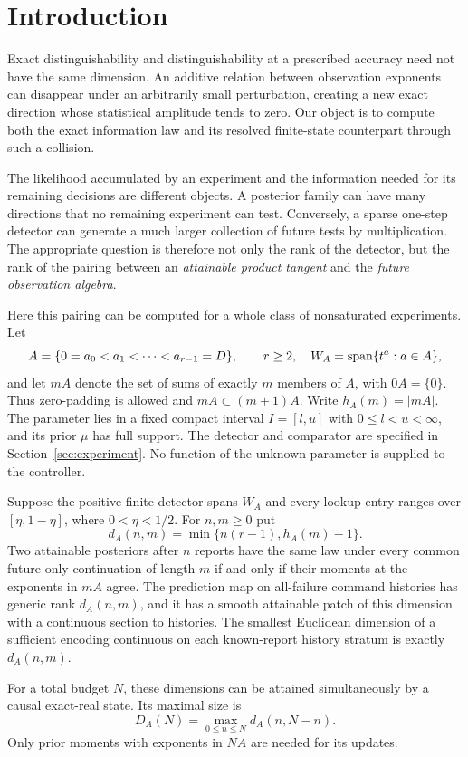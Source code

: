 \section{Introduction}
Exact distinguishability and distinguishability at a prescribed accuracy need
not have the same dimension. An additive relation between observation
exponents can disappear under an arbitrarily small perturbation, creating
a new exact direction whose statistical amplitude tends to zero. Our
object is to compute both the exact information law and its resolved
finite-state counterpart through such a collision.

The likelihood accumulated by an experiment and the information needed
for its remaining decisions are different objects. A posterior family can
have many directions that no remaining experiment can test. Conversely,
a sparse one-step detector can generate a much larger collection of
future tests by multiplication. The appropriate question is therefore not
only the rank of the detector, but the rank of the pairing between an
\emph{attainable product tangent} and the \emph{future observation algebra}.

Here this pairing can be computed for a whole class of nonsaturated
experiments. Let
\[
 A=\{0=a_0<a_1<\cdots<a_{r-1}=D\},\qquad r\ge2,
 \quad W_A=\operatorname{span}\{t^a:a\in A\},
\]
and let $mA$ denote the set of sums of exactly $m$ members of $A$, with
$0A=\{0\}$. Thus zero-padding is allowed and $mA\subset(m+1)A$.
Write $h_A(m)=|mA|$. The parameter lies in a fixed compact interval
$I=[l,u]$ with $0\le l<u<\infty$, and its prior $\mu$ has full support.
The detector and comparator are specified in Section~\ref{sec:experiment}.
No function of the unknown parameter is supplied to the controller.

\begin{theorem}\label{thm:main}
Suppose the positive finite detector spans $W_A$ and every lookup entry
ranges over $[\eta,1-\eta]$, where $0<\eta<1/2$. For $n,m\ge0$ put
\begin{equation}\label{eq:main-dimension}
 d_A(n,m)=\min\{n(r-1),h_A(m)-1\}.
\end{equation}
Two attainable posteriors after $n$ reports have the same law under every
common future-only continuation of length $m$ if and only if their moments
at the exponents in $mA$ agree. The prediction map on all-failure command
histories has generic rank $d_A(n,m)$, and it has a smooth attainable patch
of this dimension with a continuous section to histories. The smallest
Euclidean dimension of a sufficient encoding continuous on each
known-report history stratum is exactly $d_A(n,m)$.

For a total budget $N$, these dimensions can be attained simultaneously
by a causal exact-real state. Its maximal size is
\begin{equation}\label{eq:peak}
 D_A(N)=\max_{0\le n\le N}d_A(n,N-n).
\end{equation}
Only prior moments with exponents in $NA$ are needed for its updates.
\end{theorem}

